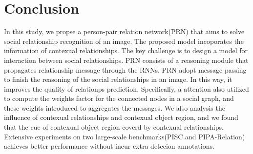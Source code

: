 \documentclass{article}
\begin{document}
\section{Conclusion}
In this study, we propse a person-pair relation network(PRN) that aims to solve social relationship recognition of an image. The proposed model incoporates the information of contexual relationships. The key challenge is to design a model for interaction between social relationships. PRN consists of a reasoning module that propagates relationship message through the RNNs. PRN adopt message passing to finish the reasoning of the social relationships in an image. In this way, it improves the quality of relationps prediction. Specifically, a attention also utilized to compute the weights factor for the connected nodes in a social graph, and these weights introduced to aggregates the messages. We also analysis the influence of contexual relationships and contexual object region, and we found that the cue of contexual object region coverd by contexual relationships. Extensive experiments on two large-scale benchmarks(PISC and PIPA-Relation) achieves better performance  without incur extra detecion annotations.

\newpage


\end{document}
